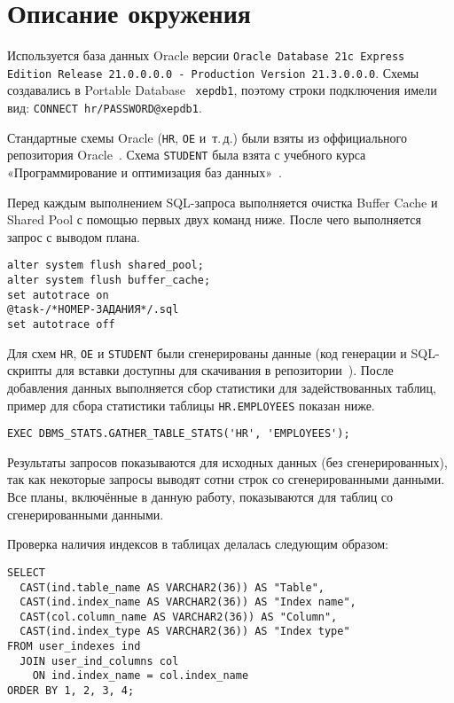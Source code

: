 

\chapter*{Описание окружения} %


Используется база данных Oracle версии \texttt{Oracle Database 21c Express Edition Release 21.0.0.0.0 - Production Version 21.3.0.0.0}.
Схемы создавались в Portable Database~\cite{PDB} \texttt{xepdb1}, поэтому строки подключения имели вид: \texttt{CONNECT hr/PASSWORD@xepdb1}.

Стандартные схемы Oracle (\texttt{HR}, \texttt{OE} и~т.\,д.) были взяты из оффициального репозитория Oracle~\cite{SampleSchemas}.
Схема \texttt{STUDENT} была взята с учебного курса «Программирование и оптимизация баз данных»~\cite{StudentSchema}.

Перед каждым выполнением SQL-запроса выполняется очистка Buffer Cache и Shared Pool с помощью первых двух команд ниже.
После чего выполняется запрос с выводом плана.
\begin{verbatim}
alter system flush shared_pool;
alter system flush buffer_cache;
set autotrace on
@task-/*НОМЕР-ЗАДАНИЯ*/.sql
set autotrace off
\end{verbatim}

Для схем \texttt{HR}, \texttt{OE} и \texttt{STUDENT} были сгенерированы данные (код генерации и SQL-скрипты для вставки доступны для скачивания в репозитории~\cite{Github}).
После добавления данных выполняется сбор статистики для задействованных таблиц, пример для сбора статистики таблицы \texttt{HR.EMPLOYEES} показан ниже.
\begin{verbatim}
EXEC DBMS_STATS.GATHER_TABLE_STATS('HR', 'EMPLOYEES');
\end{verbatim}
Результаты запросов показываются для исходных данных (без сгенерированных), так как некоторые запросы выводят сотни строк со сгенерированными данными.
Все планы, включённые в данную работу, показываются для таблиц со сгенерированными данными.

Проверка наличия индексов в таблицах делалась следующим образом:
\begin{verbatim}
SELECT
  CAST(ind.table_name AS VARCHAR2(36)) AS "Table",
  CAST(ind.index_name AS VARCHAR2(36)) AS "Index name",
  CAST(col.column_name AS VARCHAR2(36)) AS "Column",
  CAST(ind.index_type AS VARCHAR2(36)) AS "Index type"
FROM user_indexes ind
  JOIN user_ind_columns col
    ON ind.index_name = col.index_name
ORDER BY 1, 2, 3, 4;
\end{verbatim}
